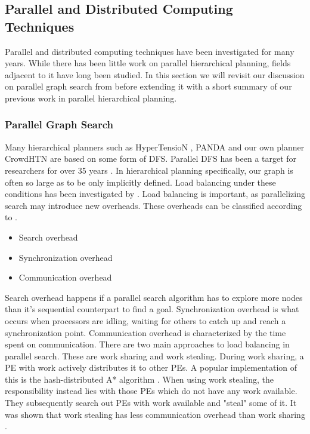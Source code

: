 \subsection{Parallel and Distributed Computing Techniques}
Parallel and distributed computing techniques have been investigated for many years. While there has been little work on parallel hierarchical planning, fields adjacent to it have long been studied. In this section we will revisit our discussion on parallel graph search from \cite{bretl2021parallel} before extending it with a short summary of our previous work in parallel hierarchical planning.

\subsubsection{Parallel Graph Search}
Many hierarchical planners such as HyperTensioN \cite{magnaguagno2020hypertension}, PANDA \cite{holler2020htn} and our own planner CrowdHTN \cite{bretl2021parallel} are based on some form of DFS. Parallel DFS has been a target for researchers for over 35 years \cite{rao1987parallel, kumar1987parallel}. In hierarchical planning specifically, our graph is often so large as to be only implicitly defined. Load balancing under these conditions has been investigated by \cite{sanders1997lastverteilungsalgorithmen}. Load balancing is important, as parallelizing search may introduce new overheads. These overheads can be classified according to \cite{fukunaga2018parallel}.
\begin{itemize}
	\item Search overhead
	\item Synchronization overhead
	\item Communication overhead
\end{itemize}
Search overhead happens if a parallel search algorithm has to explore more nodes than it's sequential counterpart to find a goal. Synchronization overhead is what occurs when processors are idling, waiting for others to catch up and reach a synchronization point. Communication overhead is characterized by the time spent on communication. There are two main approaches to load balancing in parallel search. These are work sharing and work stealing. During work sharing, a PE with work actively distributes it to other PEs. A popular implementation of this is the hash-distributed A* algorithm \cite{kishimoto2009scalable}. When using work stealing, the responsibility instead lies with those PEs which do not have any work available. They subsequently search out PEs with work available and "steal" some of it. It was shown that work stealing has less communication overhead than work sharing \cite{blumofe1999scheduling}. \\
